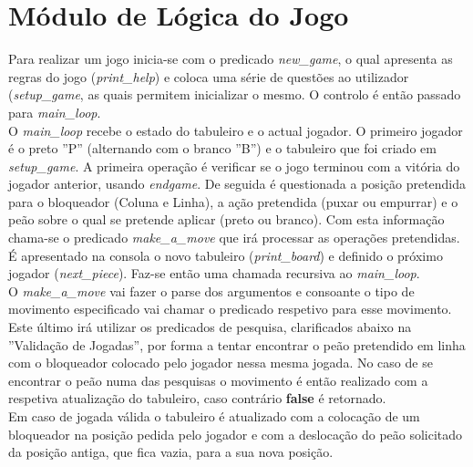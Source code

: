 \documentclass[15pt,a4paper]{article}
\begin{document}
\section{Módulo de Lógica do Jogo}
Para realizar um jogo inicia-se com o predicado \textit{new\_game}, o qual apresenta as regras do jogo (\textit{print\_help}) e coloca uma série de questões ao utilizador (\textit{setup\_game}, as quais permitem inicializar o mesmo. O controlo é então passado para \textit{main\_loop}.\\


O \textit{main\_loop} recebe o estado do tabuleiro e o actual jogador. O primeiro jogador é o preto ''P'' (alternando com o branco ''B'') e o tabuleiro que foi criado em \textit{setup\_game}. A primeira operação é verificar se o jogo terminou com a vitória do jogador anterior, usando \textit{endgame}. De seguida é questionada a posição pretendida para o bloqueador (Coluna e Linha), a ação pretendida (puxar ou empurrar) e o peão sobre o qual se pretende aplicar (preto ou branco). Com esta informação chama-se o predicado \textit{make\_a\_move} que irá processar as operações pretendidas. É apresentado na consola o novo tabuleiro (\textit{print\_board}) e definido o próximo jogador (\textit{next\_piece}). Faz-se então uma chamada recursiva ao \textit{main\_loop}.\\

O \textit{make\_a\_move} vai fazer o parse dos argumentos e consoante o tipo de movimento especificado vai chamar o predicado respetivo para esse movimento. Este último irá utilizar os predicados de pesquisa, clarificados abaixo na ''Validação de Jogadas'', por forma a tentar encontrar o peão pretendido em linha com o bloqueador colocado pelo jogador nessa mesma jogada. No caso de se encontrar o peão numa das pesquisas o movimento é então realizado com a respetiva atualização do tabuleiro, caso contrário \textbf{false} é retornado.\\


Em caso de jogada válida o tabuleiro é atualizado com a colocação de um bloqueador na posição pedida pelo jogador e com a deslocação do peão solicitado da posição antiga, que fica vazia, para a sua nova posição.\\
\end{document}
